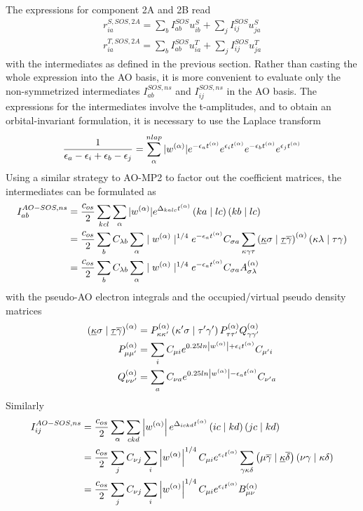 The expressions for component 2A and 2B read
\begin{align}
r_{ia}^{S,SOS,2A} = \sum_b I^{SOS}_{ab} u^S_{ib} + \sum_j I^{SOS}_{ij} u^S_{ja} \\
r_{ia}^{T,SOS,2A} = \sum_b I^{SOS}_{ab} u^T_{ia} + \sum_j I^{SOS}_{ij} u^T_{ja} 
\end{align}
\noindent with the intermediates as defined in the previous section. Rather than casting the whole expression into the AO basis, it is more convenient to evaluate only the non-symmetrized intermediates $I^{SOS,ns}_{ab}$ and $I^{SOS,ns}_{ij}$ in the AO basis.
The expressions for the intermediates involve the t-amplitudes, and to obtain an orbital-invariant formulation, it is necessary to use the Laplace transform
\begin{equation}
\frac{1}{\epsilon_a - \epsilon_i + \epsilon_b - \epsilon_j} = \sum^{nlap}_{\alpha} |w^{(\alpha)}| e^{-\epsilon_a t^{(\alpha)}} e^{\epsilon_i t^{(\alpha)}} e^{-\epsilon_b t^{(\alpha)}} e^{\epsilon_j t^{(\alpha)}} 
\end{equation}
\noindent Using a similar strategy to AO-MP2 to factor out the coefficient matrices, the intermediates can be formulated as
\begin{align}
I_{ab}^{AO-SOS,ns} &= \frac{c_{os}}{2} \sum_{kcl} \sum_{\alpha} |w^{(\alpha)}| e^{\Delta_{kalc}t^{(\alpha)}} \left( ka \mid lc \right) \left( kb \mid lc \right) \\
&= \frac{c_{os}}{2} \sum_b C_{\lambda b} \sum_{\alpha} \mid w^{(\alpha)}\mid^{1/4} e^{-\epsilon_a t^{(\alpha)}} C_{\sigma a} \sum_{\kappa \gamma \tau} \left( \underline{\kappa} \sigma \mid \underline{\tau} \overline{\gamma} \right)^{(\alpha)} \left( \kappa \lambda \mid \tau \gamma \right) \\
&= \frac{c_{os}}{2} \sum_b C_{\lambda b} \sum_{\alpha} \mid w^{(\alpha)}\mid^{1/4} e^{-\epsilon_a t^{(\alpha)}} C_{\sigma a} A^{(\alpha)}_{\sigma\lambda}
\end{align}
\noindent with the pseudo-AO electron integrals and the occupied/virtual pseudo density matrices
\begin{align}
\left( \underline{\kappa} \sigma \mid \underline{\tau} \overline{\gamma} \right)^{(\alpha)} &= P_{\kappa\kappa'}^{(\alpha)} \left( \kappa' \sigma \mid \tau' \gamma' \right) P_{\tau\tau'}^{(\alpha)} Q_{\gamma\gamma'}^{(\alpha)} \\
P_{\mu\mu'}^{(\alpha)} &= \sum_i C_{\mu i} e^{0.25 ln\left\lvert w^{(\alpha)} \right\rvert + \epsilon_i t^{(\alpha)}} C_{\mu' i} \\
Q_{\nu\nu'}^{(\alpha)} &= \sum_a C_{\nu a} e^{0.25 ln\left\lvert w^{(\alpha)} \right\rvert - \epsilon_a t^{(\alpha)}} C_{\nu' a}
\end{align}
Similarly
\begin{align}
I_{ij}^{AO-SOS,ns} &= \frac{c_{os}}{2} \sum_{\alpha} \sum_{ckd} \left\lvert w^{(\alpha)} \right\rvert e^{\Delta_{ickd}t^{(\alpha)}} \left( ic \mid kd \right) \left( jc \mid kd \right) \\
&= \frac{c_{os}}{2} \sum_j C_{\nu j} \sum_i \left\lvert w^{(\alpha)} \right\rvert^{1/4} C_{\mu i} e^{\epsilon_i t^{(\alpha)}} \sum_{\gamma\kappa\delta} \left( \mu\overline{\gamma} \mid \underline{\kappa}\overline{\delta} \right) \left( \nu\gamma \mid \kappa\delta \right) \\
&= \frac{c_{os}}{2} \sum_j C_{\nu j} \sum_i \left\lvert w^{(\alpha)} \right\rvert^{1/4} C_{\mu i} e^{\epsilon_i t^{(\alpha)}} B_{\mu\nu}^{(\alpha)}
\end{align}
